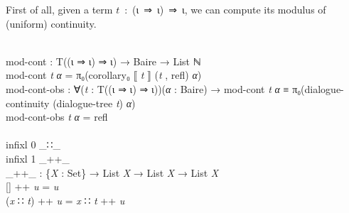 \documentclass{entcs} \usepackage{prentcsmacro}
\newcommand{\AgdaC}[1]{\mbox{#1}}
\newcommand{\AgdaFontStyle}[1]{\textsf{#1}}
\newcommand{\AgdaBoundFontStyle}[1]{\textit{#1}}
\newcommand{\AgdaKeyword}     [1]
    {\AgdaFontStyle{\textcolor{AgdaKeyword}{#1}}}
\newcommand{\AgdaNumber}      [1]{\textcolor{AgdaNumber}{#1}}
\newcommand{\AgdaSymbol}      [1]{\textcolor{AgdaSymbol}{#1}}
\newcommand{\AgdaPrimitiveType}[1]
    {\AgdaFontStyle{\textcolor{AgdaPrimitiveType}{#1}}}
\newcommand{\AgdaBound}    [1]{\AgdaBoundFontStyle{\textcolor{AgdaBound}{#1}}}
\newcommand{\AgdaInductiveConstructor}[1]
    {\AgdaFontStyle{\textcolor{AgdaInductiveConstructor}{#1}}}
\newcommand{\AgdaDatatype} [1]{\AgdaFontStyle{\textcolor{AgdaDatatype}{#1}}}
\newcommand{\AgdaFunction} [1]{\AgdaFontStyle{\textcolor{AgdaFunction}{#1}}}
\newcommand{\AgdaCodeStyle}{\small}
\newenvironment{code}%
{\noindent\AgdaCodeStyle\pboxed}%
{\endpboxed\par\noindent%
\ignorespacesafterend}
\begin{document}
First of all, given a term \AgdaC{$t$ : (ι ⇒ ι) ⇒ ι}, we can compute
its modulus of (uniform) continuity.

\begin{code}\>\<%
\\
\>\AgdaFunction{mod-cont} \AgdaSymbol{:} \AgdaDatatype{T}\AgdaSymbol{((}\AgdaInductiveConstructor{ι} \AgdaInductiveConstructor{⇒} \AgdaInductiveConstructor{ι}\AgdaSymbol{)} \AgdaInductiveConstructor{⇒} \AgdaInductiveConstructor{ι}\AgdaSymbol{)} \AgdaSymbol{→} \AgdaFunction{Baire} \AgdaSymbol{→} \AgdaDatatype{List} \AgdaDatatype{ℕ}\<%
\\
\>\AgdaFunction{mod-cont} \AgdaBound{t} \AgdaBound{α} \AgdaSymbol{=} \AgdaFunction{π₀}\AgdaSymbol{(}\AgdaFunction{corollary₀} \AgdaFunction{⟦} \AgdaBound{t} \AgdaFunction{⟧} \AgdaSymbol{(}\AgdaBound{t} \AgdaInductiveConstructor{,} \AgdaInductiveConstructor{refl}\AgdaSymbol{)} \AgdaBound{α}\AgdaSymbol{)}\<%
\\
\>\AgdaFunction{mod-cont-obs} \AgdaSymbol{:} \AgdaSymbol{∀(}\AgdaBound{t} \AgdaSymbol{:} \AgdaDatatype{T}\AgdaSymbol{((}\AgdaInductiveConstructor{ι} \AgdaInductiveConstructor{⇒} \AgdaInductiveConstructor{ι}\AgdaSymbol{)} \AgdaInductiveConstructor{⇒} \AgdaInductiveConstructor{ι}\AgdaSymbol{))(}\AgdaBound{α} \AgdaSymbol{:} \AgdaFunction{Baire}\AgdaSymbol{)} \AgdaSymbol{→} \AgdaFunction{mod-cont} \AgdaBound{t} \AgdaBound{α} \AgdaDatatype{≡} \AgdaFunction{π₀}\AgdaSymbol{(}\AgdaFunction{dialogue-continuity} \AgdaSymbol{(}\AgdaFunction{dialogue-tree} \AgdaBound{t}\AgdaSymbol{)} \AgdaBound{α}\AgdaSymbol{)}\<%
\\
\>\AgdaFunction{mod-cont-obs} \AgdaBound{t} \AgdaBound{α} \AgdaSymbol{=} \AgdaInductiveConstructor{refl}\<%
\\
%
\\
\>\AgdaKeyword{infixl} \AgdaNumber{0} \_∷\_\<%
\\
\>\AgdaKeyword{infixl} \AgdaNumber{1} \_++\_\<%
\\
\>\AgdaFunction{\_++\_} \AgdaSymbol{:} \AgdaSymbol{\{}\AgdaBound{X} \AgdaSymbol{:} \AgdaPrimitiveType{Set}\AgdaSymbol{\}} \AgdaSymbol{→} \AgdaDatatype{List} \AgdaBound{X} \AgdaSymbol{→} \AgdaDatatype{List} \AgdaBound{X} \AgdaSymbol{→} \AgdaDatatype{List} \AgdaBound{X}\<%
\\
\>\AgdaInductiveConstructor{[]} \AgdaFunction{++} \AgdaBound{u} \AgdaSymbol{=} \AgdaBound{u}\<%
\\
\>\AgdaSymbol{(}\AgdaBound{x} \AgdaInductiveConstructor{∷} \AgdaBound{t}\AgdaSymbol{)} \AgdaFunction{++} \AgdaBound{u} \AgdaSymbol{=} \AgdaBound{x} \AgdaInductiveConstructor{∷} \AgdaBound{t} \AgdaFunction{++} \AgdaBound{u}\<%

\end{code}
\end{document}
